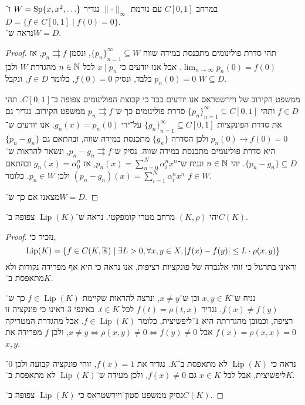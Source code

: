 \question{}
במרחב $C[0, 1]$ עם נורמת $\lVert \cdot \rVert_\infty$ נגדיר $W = \operatorname{Sp}\{ x, x^2, \ldots \}$ ו־$D = \{ f \in C[0, 1] \mid f(0) = 0 \}$. \\
נראה ש־$\overline{W} = D$.
\begin{proof}
	תהי סדרת פולינומים מתכנסת במידה שווה ${\{ p_n \}}_{n = 1}^\infty \subseteq W$, ונסמן $p_n \rightrightarrows f$, אז $\lim_{n \to \infty} p_n(0) = f(0)$.
	אבל אנו יודעים כי $x \mid p_n$ לכל $n \in \mathbb{N}$ מהגדרת $W$ ולכן $p_n(0) = 0$ בלבד, ונסיק $f(0) = 0$, כלומר $f \in D$, ונקבל $\overline{W} \subseteq D$.

	ממשפט הקירוב של ויירשטראס אנו יודעים כבר כי קבוצת הפולינומים צפופה ב־$C[0, 1]$.
	תהי $f \in D$ ותהי ${\{ p_n \}}_{n = 1}^\infty \subseteq C[0, 1]$ סדרת פולינומים כך ש־$p_n \rightrightarrows f$ ממשפט הקירוב.
	נגדיר גם את סדרת הפונקציות ${\{ g_n \}}_{n = 1}^\infty \subseteq C[0, 1]$ על־ידי $g_n(x) = p_n(0)$.
	אנו יודעים ש־$p_n(0) \to f(0) = 0$ ולכן הסדרה $\{ g_n \}$ מתכנסת במידה שווה, ובהתאם גם $\{ p_n - g_n \}$ היא סדרת פולינומים מתכנסת במידה שווה.
	נסיק ש־$p_n - g_n \rightrightarrows f$, ונשאר להראות ש־$\{ p_n - g_n \} \subseteq D$.
	יהי $n \in \mathbb{N}$ ונניח ש־$p_n(x) = \sum_{n = 0}^N \alpha_i^n x^n$, אז $g_n(x) = \alpha_0^n$ ובהתאם $(p_n - g_n)(x) = \sum_{i = 1}^N \alpha_i^n x^n$ ולכן $p_n \in W$.
	כלומר $f \in \overline{W}$.

	מצאנו אם כך ש־$\overline{W} = D$.
\end{proof}

\question{}
יהי $(K, \rho)$ מרחב מטרי קומפקטי.
נראה ש־$\operatorname{Lip}(K)$ צפופה ב־$C(K)$.
\begin{proof}
	נזכיר כי,
	\[
		\operatorname{Lip}(K)
		= \{ f \in C(K, \mathbb{R}) \mid \exists L > 0, \forall x, y \in X, |f(x) - f(y)| \le L \cdot \rho(x, y) \}
	\]
	וראינו בתרגול כי זוהי אלגברה של פונקציות רציפות, אנו נראה כי היא אף מפרידה נקודות ולא מתאפסת ב־$K$.

	נניח ש־$x, y \in K$ וכן ש־$x \ne y$, ונרצה להראות שקיימת $f \in \operatorname{Lip}(K)$ כך ש־$f(x) \ne f(y)$.
	נגדיר $f(t) = \rho(t, x)$ לכל $t \in K$.
	באינפי 3 ראינו כי פונקציה זו רציפה, וכמובן מהגדרתה היא $1$־ליפשיצית, כלומר $f \in \operatorname{Lip}(K)$.
	אבל מהגדרת המטריקה $f(x) = \rho(x, x) = 0$ אבל $x \ne y \iff \rho(x, y) \ne 0 \iff f(y) \ne 0$, ולכן $f$ מפרידה את $x, y$.

	נראה כי $\operatorname{Lip}(K)$ לא מתאפסת ב־$K$.
	נגדיר את $f(x) = 1$, זוהי פונקציה קבועה ולכן $0$־ליפשיצית, אבל לכל $x \in K$ גם $f(x) \ne 0$, ולכן מעידה ש־$\operatorname{Lip}(K)$ לא מתאפסת ב־$K$.

	נסיק ממשפט סטון־ויירשטראס כי $\operatorname{Lip}(K)$ צפופה ב־$C(K)$.
\end{proof}


